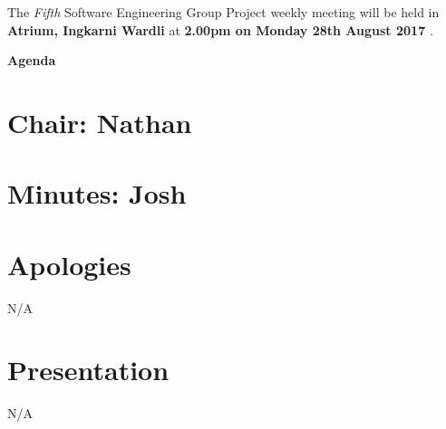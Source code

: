 \documentclass[11pt, a4paper]{article}
\newcommand{\meetingno}{ Fifth }
\newcommand{\meetinglocation}{ Atrium, Ingkarni Wardli } %
\newcommand{\meetingdatetime}{ 2.00pm on Monday 28th August 2017 } %
\newcommand{\meetingchair}{ Nathan } %
\newcommand{\meetingminutes}{ Josh } %
\begin{document}
  \noindent The {\em \meetingno} Software Engineering Group Project weekly meeting will be held in {\bf \meetinglocation } at {\bf \meetingdatetime }.

  \vspace*{15pt}

  \begin{center}
  \huge \bf Agenda
  \end{center}

  \begin{flushleft}
  
  \section*{Chair: \meetingchair }
  \section*{Minutes: \meetingminutes }
  
  \vspace*{10pt}

  \section{Apologies}
	N/A

  \section{Presentation}
	N/A
  

\end{flushleft}
\end{document}
